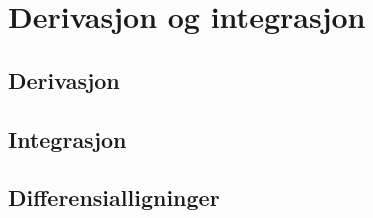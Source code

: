 \chapter{Derivasjon og integrasjon}

\section{Derivasjon}
\section{Integrasjon}
\section{Differensialligninger}
